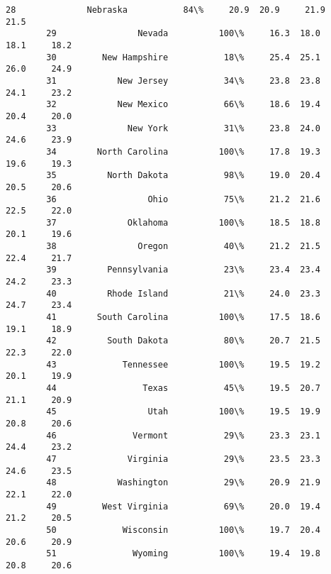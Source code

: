 \documentclass[11pt]{article}
\begin{document}
\begin{Verbatim}[commandchars=\\\{\}]
        28              Nebraska           84\%     20.9  20.9     21.9     21.5   
        29                Nevada          100\%     16.3  18.0     18.1     18.2   
        30         New Hampshire           18\%     25.4  25.1     26.0     24.9   
        31            New Jersey           34\%     23.8  23.8     24.1     23.2   
        32            New Mexico           66\%     18.6  19.4     20.4     20.0   
        33              New York           31\%     23.8  24.0     24.6     23.9   
        34        North Carolina          100\%     17.8  19.3     19.6     19.3   
        35          North Dakota           98\%     19.0  20.4     20.5     20.6   
        36                  Ohio           75\%     21.2  21.6     22.5     22.0   
        37              Oklahoma          100\%     18.5  18.8     20.1     19.6   
        38                Oregon           40\%     21.2  21.5     22.4     21.7   
        39          Pennsylvania           23\%     23.4  23.4     24.2     23.3   
        40          Rhode Island           21\%     24.0  23.3     24.7     23.4   
        41        South Carolina          100\%     17.5  18.6     19.1     18.9   
        42          South Dakota           80\%     20.7  21.5     22.3     22.0   
        43             Tennessee          100\%     19.5  19.2     20.1     19.9   
        44                 Texas           45\%     19.5  20.7     21.1     20.9   
        45                  Utah          100\%     19.5  19.9     20.8     20.6   
        46               Vermont           29\%     23.3  23.1     24.4     23.2   
        47              Virginia           29\%     23.5  23.3     24.6     23.5   
        48            Washington           29\%     20.9  21.9     22.1     22.0   
        49         West Virginia           69\%     20.0  19.4     21.2     20.5   
        50             Wisconsin          100\%     19.7  20.4     20.6     20.9   
        51               Wyoming          100\%     19.4  19.8     20.8     20.6   
        

\end{Verbatim}
\end{document}
